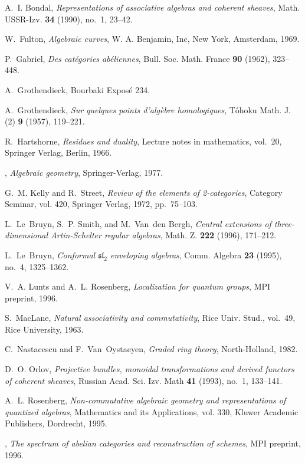 \documentclass{amsproc}
\theoremstyle{definition}
\theoremstyle{remark}
\numberwithin{equation}{section}
\numberwithin{table}{section}
\numberwithin{figure}{section}
\begin{document}
\begin{thebibliography}{10}
A.~I. Bondal, {\em Representations of associative algebras and coherent
  sheaves}, Math. USSR-Izv. {\bf 34} (1990), no.~1, 23--42.

W.~Fulton, {\em Algebraic curves}, W. A. Benjamin, Inc, New York, Amsterdam,
  1969.

P.~Gabriel, {\em Des cat\'egories ab\'eliennes}, Bull. Soc. Math. France {\bf
  90} (1962), 323--448.

A.~Grothendieck, Bourbaki Expos\'e 234.

A.~Grothendieck, {\em Sur quelques points d'alg\`ebre homologiques}, T{\^o}hoku
  Math. J. (2) {\bf 9} (1957), 119--221.

R.~Hartshorne, {\em Residues and duality}, Lecture notes in mathematics,
  vol.~20, Springer Verlag, Berlin, 1966.

\bysame, {\em Algebraic geometry}, Springer-Verlag, 1977.

G.~M. Kelly and R.~Street, {\em Review of the elements of 2-categories},
  Category Seminar, vol. 420, Springer Verlag, 1972, pp.~75--103.

L.~Le~Bruyn, S.~P. Smith, and M.~Van~den Bergh, {\em Central extensions of
  three-dimensional {A}rtin-{S}chelter regular algebras}, Math. Z. {\bf 222}
  (1996), 171--212.

L.~Le~Bruyn, {\em Conformal {$\mathfrak{sl}_2$} enveloping algebras}, Comm.
  Algebra {\bf 23} (1995), no.~4, 1325--1362.

V.~A. Lunts and A.~L. Rosenberg, {\em Localization for quantum groups}, MPI
  preprint, 1996.

S.~MacLane, {\em Natural associativity and commutativity}, Rice Univ. Stud.,
  vol.~49, Rice University, 1963.

C.~Nastacescu and F.~Van~Oystaeyen, {\em Graded ring theory}, North-Holland,
  1982.

D.~O. Orlov, {\em Projective bundles, monoidal transformations and derived
  functors of coherent sheaves}, Russian Acad. Sci. Izv. Math {\bf 41} (1993),
  no.~1, 133--141.

A.~L. Rosenberg, {\em Non-commutative algebraic geometry and representations of
  quantized algebras}, Mathematics and its Applications, vol. 330, Kluwer
  Academic Publishers, Dordrecht, 1995.

\bysame, {\em The spectrum of abelian categories and reconstruction of
  schemes}, MPI preprint, 1996.


\end{thebibliography}
\end{document}
